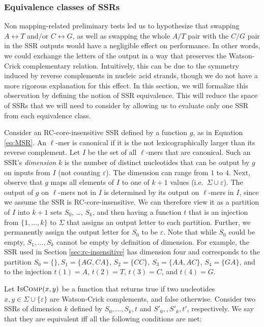 \documentclass[
  11pt,
  twoside]{scrbook}
\begin{document}
\hypertarget{sec:equiv}{%
\subsubsection{Equivalence classes of SSRs}\label{sec:equiv}}

Non mapping-related preliminary tests led us to hypothesize that swapping \(A\leftrightarrow T\) and/or \(C\leftrightarrow G\), as well as swapping the whole \(A/T\) pair with the \(C/G\) pair in the SSR outputs would have a negligible effect on performance. In other words, we could exchange the letters of the output in a way that preserves the Watson-Crick complementary relation. Intuitively, this can be due to the symmetry induced by reverse complements in nucleic acid strands, though we do not have a more rigorous explanation for this effect. In this section, we will formalize this observation by defining the notion of SSR equivalence. This will reduce the space of SSRs that we will need to consider by allowing us to evaluate only one SSR from each equivalence class.

Consider an RC-core-insensitive SSR defined by a function \(g\), as in Equation \eqref{eq:MSR}. An \(\ell\)-mer is canonical if it is the not lexicographically larger than its reverse complement. Let \(I\) be the set of all \(\ell\)-mers that are canonical. Such an SSR's \emph{dimension} \(k\) is the number of distinct nucleotides that can be output by \(g\) on inputs from \(I\) (not counting \(\varepsilon\)). The dimension can range from \(1\) to \(4\). Next, observe that \(g\) maps all elements of \(I\) to one of \(k+ 1\) values (i.e.~\(\Sigma \cup \varepsilon\)). The output of \(g\) on \(\ell\)-mers not in \(I\) is determined by its output on \(\ell\)-mers in \(I\), since we assume the SSR is RC-core-insensitive. We can therefore view it as a partition of \(I\) into \(k+1\) sets \(S_0\), \ldots, \(S_k\), and then having a function \(t\) that is an injection from \(\{1, \ldots, k\}\) to \(\Sigma\) that assigns an output letter to each partition. Further, we permanently assign the output letter for \(S_0\) to be \(\varepsilon\). Note that while \(S_0\) could be empty, \(S_1, \ldots, S_k\) cannot be empty by definition of dimension. For example, the SSR used in Section \ref{sec:rc-insensitive} has dimension four and corresponds to the partition \(S_0 = \{\}, S_1=\{AG,CA\}\), \(S_2=\{CC\}\), \(S_3=\{AA,AC\}\), \(S_4=\{GA\}\), and to the injection \(t(1) = A\), \(t(2) =T\), \(t(3) = C\), and \(t(4) = G\).

Let \(\textsc{IsComp}(x,y)\) be a function that returns true if two nucleotides \(x, y \in \Sigma \cup \{\varepsilon\}\) are Watson-Crick complements, and false otherwise. Consider two SSRs of dimension \(k\) defined by \(S_0, \ldots, S_k, t\) and \(S'_0, , S'_k, t'\), respectively. We say that they are equivalent iff all the following conditions are met:
\end{document}

